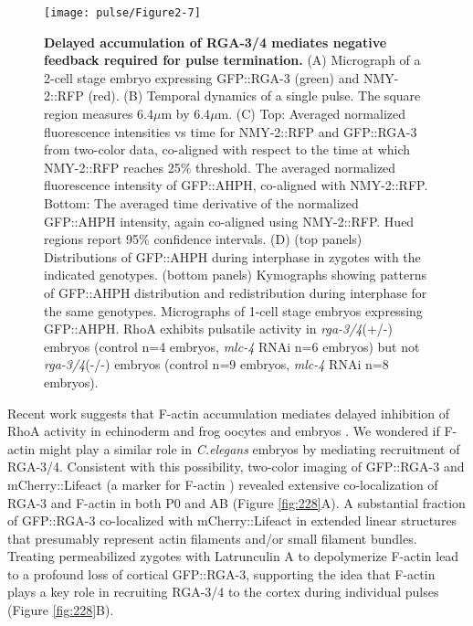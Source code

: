 \begin{figure}[!htbp]
\centering
\texttt{[image: pulse/Figure2-7]}

\caption[Delayed accumulation of RGA-3/4 mediates negative feedback required for pulse termination.]{\label{fig:227}\textbf{Delayed accumulation of RGA-3/4 mediates negative feedback required for pulse termination.} (A) Micrograph of a 2-cell stage embryo expressing GFP::RGA-3 (green) and NMY-2::RFP (red). (B) Temporal dynamics of a single pulse. The square region measures 6.4$\mu$m by 6.4$\mu$m. (C) Top: Averaged normalized fluorescence intensities vs time for NMY-2::RFP and GFP::RGA-3 from two-color data, co-aligned with respect to the time at which NMY-2::RFP reaches 25$\%$ threshold. The averaged normalized fluorescence intensity of GFP::AHPH, co-aligned with NMY-2::RFP.  Bottom: The averaged time derivative of the normalized GFP::AHPH intensity, again co-aligned using NMY-2::RFP.  Hued regions report 95$\%$ confidence intervals. (D) (top panels) Distributions of GFP::AHPH during interphase in zygotes  with the indicated genotypes.  (bottom panels) Kymographs showing patterns of GFP::AHPH distribution and redistribution during interphase for the same genotypes. Micrographs of 1-cell stage embryos expressing GFP::AHPH. RhoA exhibits pulsatile activity in \textit{rga-3/4}(+/-) embryos (control n=4 embryos, \textit{mlc-4} RNAi n=6 embryos) but not \textit{rga-3/4}(-/-) embryos (control n=9 embryos, \textit{mlc-4} RNAi n=8 embryos).}
\end{figure}

Recent work suggests that F-actin accumulation mediates delayed inhibition of RhoA activity in echinoderm and frog oocytes and embryos  \cite{Bement:2015jp}.  We wondered if F-actin might play a similar role in \textit{C.elegans} embryos by mediating recruitment of RGA-3/4.  Consistent with this possibility, two-color imaging of GFP::RGA-3 and mCherry::Lifeact  (a marker for F-actin   \cite{Pohl:2012bg}) revealed extensive co-localization of RGA-3 and F-actin in both P0 and AB (Figure \ref{fig:228}A).  A substantial fraction of GFP::RGA-3 co-localized with mCherry::Lifeact in extended linear structures that presumably represent actin filaments and/or small filament bundles. Treating permeabilized zygotes  \cite{Carvalho:2011ce, Olson:2012cs} with Latrunculin A to depolymerize F-actin lead to a profound loss of cortical GFP::RGA-3, supporting the idea that F-actin plays a key role in recruiting RGA-3/4 to the cortex during individual pulses (Figure \ref{fig:228}B).




